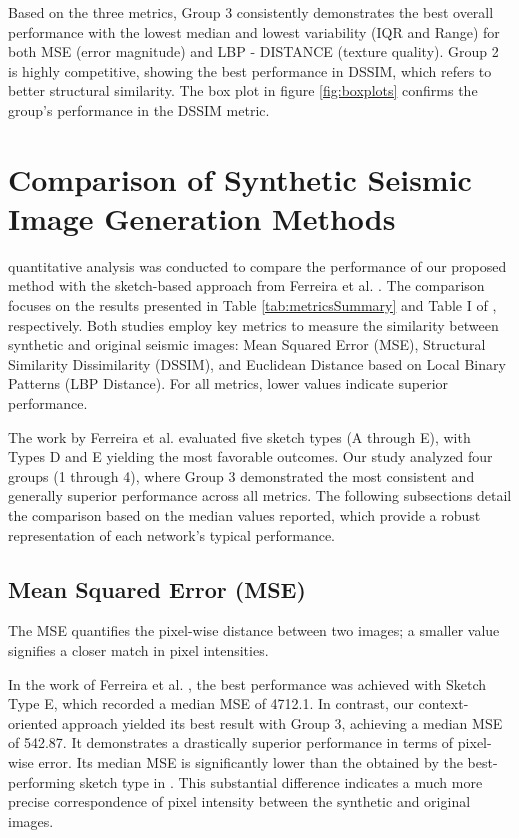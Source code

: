 \documentclass{ieeeaccess}
\begin{document}
Based on the three metrics, Group 3 consistently demonstrates the best overall performance with the lowest median and lowest variability (IQR and Range) for both MSE (error magnitude) and LBP - DISTANCE (texture quality). Group 2 is highly competitive, showing the best performance in DSSIM, which refers to better structural similarity.  The box plot in figure \ref{fig:boxplots} confirms the group's performance in the DSSIM metric.

\section{Comparison of Synthetic Seismic Image Generation Methods}

 quantitative analysis was conducted to compare the performance of our proposed method with the sketch-based approach from Ferreira et al. \cite{ref19}. The comparison focuses on the results presented in Table \ref{tab:metricsSummary} and Table I of \cite{ref19}, respectively. Both studies employ key metrics to measure the similarity between synthetic and original seismic images: Mean Squared Error (MSE), Structural Similarity Dissimilarity (DSSIM), and Euclidean Distance based on Local Binary Patterns (LBP Distance). For all metrics, lower values indicate superior performance.

The work by Ferreira et al. \cite{ref19} evaluated five sketch types (A through E), with Types D and E yielding the most favorable outcomes. Our study analyzed four groups (1 through 4), where Group 3 demonstrated the most consistent and generally superior performance across all metrics. The following subsections detail the comparison based on the median values reported, which provide a robust representation of each network's typical performance.

\subsection{Mean Squared Error (MSE)}

The MSE quantifies the pixel-wise distance between two images; a smaller value signifies a closer match in pixel intensities.

In the work of Ferreira et al. \cite{ref19}, the best performance was achieved with Sketch Type E, which recorded a median MSE of 4712.1. In contrast, our context-oriented approach yielded its best result with Group 3, achieving a median MSE of 542.87. It demonstrates a drastically superior performance in terms of pixel-wise error. Its median MSE is significantly lower than the obtained by the best-performing sketch type in \cite{ref19}. This substantial difference indicates a much more precise correspondence of pixel intensity between the synthetic and original images.
\end{document}
